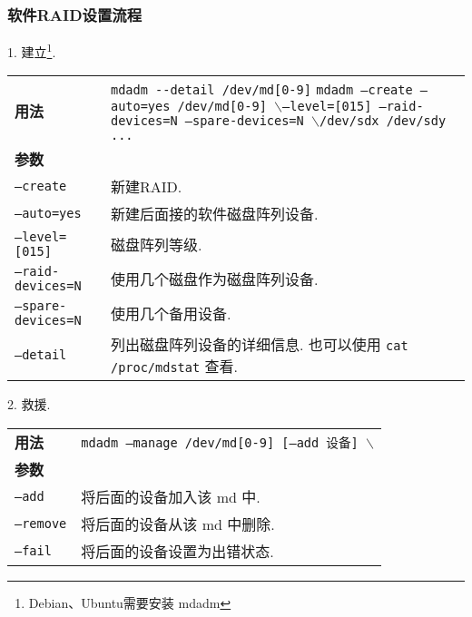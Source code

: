 \subsubsection{软件RAID设置流程}
\par
1. 建立\footnote[1]{Debian、Ubuntu需要安装 mdadm}.
\begin{longtable}{l@{ : }p{}}\hline\hline

    \textbf{用法} & \verb"mdadm --detail /dev/md[0-9]" \newline
                    \texttt{mdadm --create --auto=yes /dev/md[0-9] $\backslash$\newline --level=[015]  --raid-devices=N  --spare-devices=N $\backslash$\newline /dev/sdx /dev/sdy ...}  \\
    \multicolumn{2}{l}{\bfseries 参数}\\

    \texttt{--create} & 新建RAID.\\

    \texttt{--auto=yes} & 新建后面接的软件磁盘阵列设备.\\

    \texttt{--level=[015]} & 磁盘阵列等级.\\

    \texttt{--raid-devices=N} & 使用几个磁盘作为磁盘阵列设备.\\

    \texttt{--spare-devices=N} & 使用几个备用设备.\\

    \texttt{--detail} & 列出磁盘阵列设备的详细信息. 也可以使用 \texttt{cat /proc/mdstat} 查看.\\

    \hline
\end{longtable}

\par
2. 救援.
\begin{longtable}{l@{ : }p{}}\hline\hline

    \textbf{用法} & \texttt{mdadm --manage /dev/md[0-9] [--add 设备] $\backslash$\newline [-remove 设备] [--fail 设备]}  \\
    \multicolumn{2}{l}{\bfseries 参数}\\

    \texttt{--add} & 将后面的设备加入该 md 中.\\

    \texttt{--remove} & 将后面的设备从该 md 中删除.\\

    \texttt{--fail} & 将后面的设备设置为出错状态.\\

    \hline
\end{longtable}

